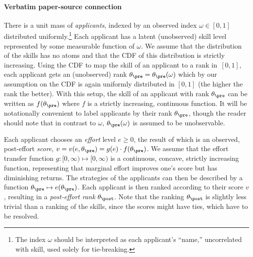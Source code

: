 \documentclass[10pt]{article}
\begin{document}
\paragraph{Verbatim paper-source connection}
\begin{ReviewVerbatim}
There is a unit mass of \textit{applicants}, indexed by an observed index $\omega \in [0,1]$ distributed uniformly.\footnote{The index $\omega$ should be interpreted as each applicant's ``name,'' uncorrelated with skill, used solely for tie-breaking.}  Each applicant has a latent (unobserved) skill level represented by some measurable function of $\omega$.
We assume that {the distribution of the skills} has no atoms and that the CDF of this distribution is strictly increasing.
Using the CDF to map the skill of an applicant to a rank in~$[0,1]$, each applicant gets an (unobserved) rank $\theta_\pre =\theta_\pre(\omega)$ which by our assumption on the CDF is again uniformly distributed in $[0, 1]$ (the higher the rank the better).  With this setup, the skill of an applicant with rank $\theta_\pre$ can be written as $f(\theta_\pre)$ where $f$ is a strictly increasing, continuous function.  {It will be notationally convenient to label applicants by their rank $\theta_\pre$, though the reader should note that in contrast to $\omega$, $\theta_\pre(\omega)$ is assumed to be unobservable.}



Each applicant chooses an \textit{effort} level $e \ge 0$, the result of which is an observed, post-effort \textit{score}, {$v=v(e,\theta_\pre) = {g(e)}\cdot{f(\theta_\pre)}$}. 
{We assume} that the effort transfer function $g: [0, \infty) \mapsto [0, \infty)$ is a continuous, concave, strictly increasing function, representing that marginal effort improves one's score but has diminishing returns.
{%
{T}he strategies of the applicants can {then} be described by a function $\theta_\pre \mapsto e(\theta_\pre)$.
}
  Each {applicant} is then ranked according to their score $v$%
, resulting in a \textit{post-effort rank} $\theta_\post$.
Note that the ranking $\theta_\post$ is slightly less trivial than a ranking of the skills, since the scores might have ties, which have to be resolved.


\end{ReviewVerbatim}
\end{document}
